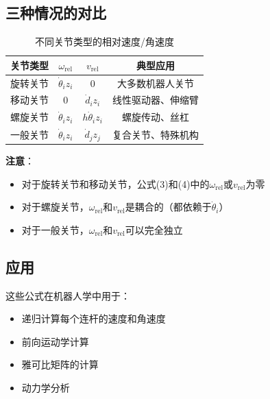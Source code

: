 \documentclass[12pt,a4paper]{article}
\begin{document}
\subsection{三种情况的对比}

\begin{table}[h]
\centering
\begin{tabular}{|l|c|c|c|}
\hline
\textbf{关节类型} & $\omega_{\text{rel}}$ & $v_{\text{rel}}$ & \textbf{典型应用} \\
\hline
旋转关节 & $\dot{\theta}_i z_i$ & $0$ & 大多数机器人关节 \\
\hline
移动关节 & $0$ & $\dot{d}_i z_i$ & 线性驱动器、伸缩臂 \\
\hline
螺旋关节 & $\dot{\theta}_i z_i$ & $h \dot{\theta}_i z_i$ & 螺旋传动、丝杠 \\
\hline
一般关节 & $\dot{\theta}_i z_i$ & $\dot{d}_j z_j$ & 复合关节、特殊机构 \\
\hline
\end{tabular}
\caption{不同关节类型的相对速度/角速度}
\end{table}

\textbf{注意}：
\begin{itemize}
\item 对于旋转关节和移动关节，公式(3)和(4)中的$\omega_{\text{rel}}$或$v_{\text{rel}}$为零
\item 对于螺旋关节，$\omega_{\text{rel}}$和$v_{\text{rel}}$是耦合的（都依赖于$\dot{\theta}_i$）
\item 对于一般关节，$\omega_{\text{rel}}$和$v_{\text{rel}}$可以完全独立
\end{itemize}

\subsection{应用}

这些公式在机器人学中用于：
\begin{itemize}
\item 递归计算每个连杆的速度和角速度
\item 前向运动学计算
\item 雅可比矩阵的计算
\item 动力学分析
\end{itemize}
\end{document}
